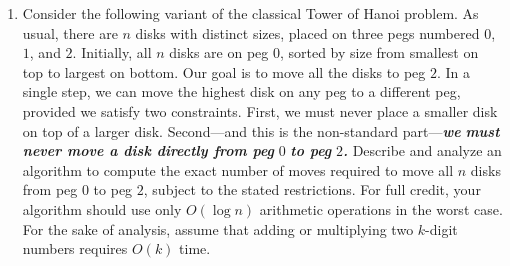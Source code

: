 \begin{enumerate}[label=\arabic*.,ref=\thechapter.\arabic*,leftmargin=*,align=left,widest*=99,itemsep=1.5ex plus 0.5ex]
\item {} Consider the following variant of the classical Tower of Hanoi problem.
As usual, there are $n$ disks with distinct sizes, placed on three pegs numbered $0$, $1$, and $2$.
Initially, all $n$ disks are on peg $0$, sorted by size from smallest on top to largest on bottom.
Our goal is to move all the disks to peg $2$.
In a single step, we can move the highest disk on any peg to a different peg,
provided we satisfy two constraints.
First, we must never place a smaller disk on top of a larger disk.
Second—and this is the non-standard part—\textbf{\textit{we}} \textbf{\textit{must never move a disk directly from peg}} $0$ \textbf{\textit{to peg}} $2$\textbf{\textit{.}}
Describe and analyze an algorithm to compute the exact number of moves required to move all $n$ disks from peg $0$ to peg $2$, subject to the stated restrictions.
For full credit, your algorithm should use only $O(\log n)$ arithmetic operations in the worst case.
For the sake of analysis, assume that adding or multiplying two $k$-digit numbers requires $O(k)$ time.
\end{enumerate}
